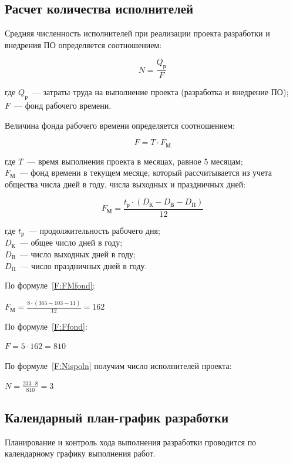 \normalsize

\subsection{Расчет количества исполнителей}
Средняя численность исполнителей при реализации проекта разработки и внедрения ПО определяется соотношением:

\begin{equation}
N = \frac{Q_{\text{р}}}{F}
\label{F:Nispoln}
\end{equation}

где $Q_\text{р}$~--- затраты труда на выполнение проекта (разработка и внедрение ПО); \\ $F$~--- фонд рабочего времени.

Величина фонда рабочего времени определяется соотношением:

\begin{equation}
F = T \cdot F_{\text{М}}
\label{F:Ffond}
\end{equation}

где $T$~--- время выполнения проекта в месяцах, равное 5 месяцам; \\ $F_\text{М}$~--- фонд времени в текущем месяце, который рассчитывается из учета общества числа дней в году, числа выходных и праздничных дней:

\begin{equation}
F_{\text{М}} = \frac{t_{\text{р}} \cdot (D_{\text{К}} - D_{\text{В}} - D_{\text{П}})}{12}
\label{F:FMfond}
\end{equation}

где $t_{\text{р}}$~--- продолжительность рабочего дня; \\ $D_{\text{К}}$~--- общее число дней в году; \\ $D_{\text{В}}$~--- число выходных дней в году; \\ $D_{\text{П}}$~--- число праздничных дней в году.

По формуле~\ref{F:FMfond}:

$F_{\text{М}} = \frac{8 \cdot (365 - 103 - 11)}{12} = 162$

По формуле~\ref{F:Ffond}:

$F = 5 \cdot 162 = 810$

По формуле~\ref{F:Nispoln} получим число исполнителей проекта:

$N = \frac{233 \cdot 8}{810} = 3$

\subsection{Календарный план-график разработки}
Планирование и контроль хода выполнения разработки проводится по календарному графику выполнения работ.

